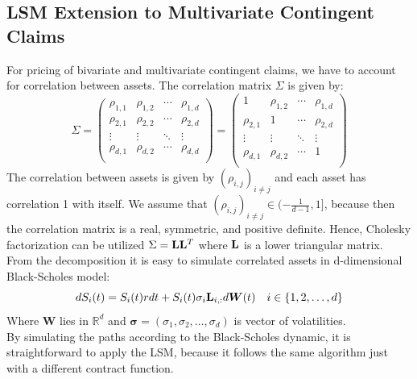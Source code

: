 \subsection{LSM Extension to Multivariate Contingent Claims}
For pricing of bivariate and multivariate contingent claims, we have to account for correlation between assets. The correlation matrix $\Sigma$ is given by:
\begin{equation}
\Sigma = \begin{pmatrix}
\rho_{1,1} & \rho_{1,2} & \cdots & \rho_{1,d} \\
\rho_{2,1} & \rho_{2,2} & \cdots & \rho_{2,d} \\
\vdots & \vdots & \ddots & \vdots \\
\rho_{d,1} & \rho_{d,2} & \cdots & \rho_{d,d} \\
\end{pmatrix} = \begin{pmatrix}
1 & \rho_{1,2} & \cdots & \rho_{1,d} \\
\rho_{2,1} & 1 & \cdots & \rho_{2,d} \\
\vdots & \vdots & \ddots & \vdots \\
\rho_{d,1} & \rho_{d,2} & \cdots & 1 \\
\end{pmatrix}
\end{equation}
The correlation between assets is given by $(\rho_{i,j})_{i\neq j}$ and each asset has correlation 1 with itself. We assume that $(\rho_{i,j})_{i \neq j} \in (-\frac{1}{d-1},1]$, because then the correlation matrix is a real, symmetric, and positive definite. Hence, Cholesky factorization can be utilized $\Sigma=\mathbf{L}\mathbf{L}^T$ where $\mathbf{L}$ is a lower triangular matrix. From the decomposition it is easy to simulate correlated assets in d-dimensional Black-Scholes model:
\begin{equation}
dS_{i}(t)=S_{i}(t) r dt + S_{i}(t) \sigma_i \mathbf{L}_{i,:} d\bm{W}(t) \quad i \in \{1,2,\ldots, d\}
\end{equation}
Where $\bm{W}$ lies in $\mathbb{R}^d$ and $\bm{\sigma}=(\sigma_1, \sigma_2, \ldots, \sigma_d)$ is vector of volatilities.\\

By simulating the paths according to the Black-Scholes dynamic, it is straightforward to apply the LSM, because it follows the same algorithm just with a different contract function.

\newpage


